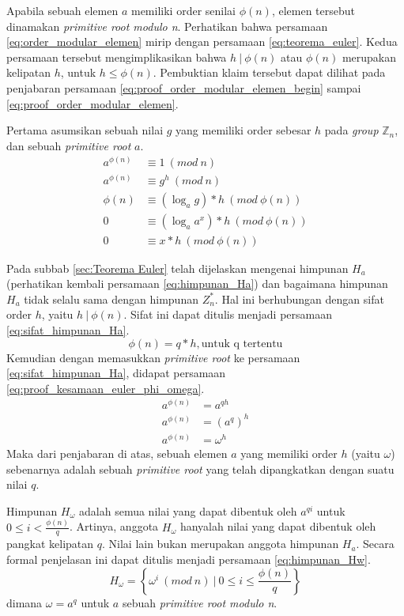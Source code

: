 Apabila sebuah elemen $ a $ memiliki order senilai $ \phi(n) $, elemen tersebut dinamakan \textit{primitive root modulo n}.
Perhatikan bahwa persamaan \eqref{eq:order_modular_elemen} mirip dengan persamaan \eqref{eq:teorema_euler}. Kedua persamaan tersebut mengimplikasikan bahwa $ h\ |\ \phi(n) $ atau $ \phi(n) $ merupakan kelipatan $ h $, untuk $ h\leq \phi(n) $. Pembuktian klaim tersebut dapat dilihat pada penjabaran persamaan \eqref{eq:proof_order_modular_elemen_begin} sampai \eqref{eq:proof_order_modular_elemen}.

Pertama asumsikan sebuah nilai $ g $ yang memiliki order sebesar $ h $ pada \textit{group} $ \mathbb{Z}_n $, dan sebuah \textit{primitive root} $ a $.
\begin{align}
\label{eq:proof_order_modular_elemen_begin}
a^{\phi(n)} &\equiv 1\ (mod\ n)	\\
a^{\phi(n)} &\equiv g^h\ (mod\ n) \\
\phi(n) &\equiv (\log_a g) * h\ (mod\ \phi(n)) \\
0 &\equiv (\log_a {a^x}) * h\ (mod\ \phi(n)) \\
0 &\equiv x * h\ (mod\ \phi(n))
\label{eq:proof_order_modular_elemen}
\end{align}

Pada subbab \ref{sec:Teorema Euler} telah dijelaskan mengenai himpunan $ H_a $ (perhatikan kembali persamaan \eqref{eq:himpunan_Ha}) dan bagaimana himpunan $ H_a $ tidak selalu sama dengan himpunan $ Z_n^* $. Hal ini berhubungan dengan sifat order $ h $, yaitu $ h\ |\ \phi(n) $. Sifat ini dapat ditulis menjadi persamaan \eqref{eq:sifat_himpunan_Ha}.
\begin{equation}
\phi(n)=q*h,\text{untuk q tertentu}
\label{eq:sifat_himpunan_Ha}
\end{equation}
Kemudian dengan memasukkan \textit{primitive root} ke persamaan \eqref{eq:sifat_himpunan_Ha}, didapat persamaan \eqref{eq:proof_kesamaan_euler_phi_omega}.
\begin{align}
a^{\phi(n)} &=a^{qh} \\
a^{\phi(n)} &=(a^q)^h \\
a^{\phi(n)} &=\omega^h
\label{eq:proof_kesamaan_euler_phi_omega}
\end{align}
Maka dari penjabaran di atas, sebuah elemen $ a $ yang memiliki order $ h $ (yaitu $\omega$) sebenarnya adalah sebuah \textit{primitive root} yang telah dipangkatkan dengan suatu nilai $ q $.\hfill\eop

Himpunan $ H_{\omega} $ adalah semua nilai yang dapat dibentuk oleh $ a^{qi} $ untuk $ 0\leq i < \frac{\phi(n)}{q} $. Artinya, anggota $ H_{\omega} $ hanyalah nilai yang dapat dibentuk oleh pangkat kelipatan $ q $. Nilai lain bukan merupakan anggota himpunan $ H_a $. Secara formal penjelasan ini dapat ditulis menjadi persamaan \eqref{eq:himpunan_Hw}.
\begin{equation}
H_{\omega}=\left\{\omega^i\ (mod\ n)\ |\ 0 \leq i \leq \frac{\phi(n)}{q}\right\}
\label{eq:himpunan_Hw}
\end{equation}
dimana $ \omega=a^q $ untuk $ a $ sebuah \textit{primitive root modulo n}.

